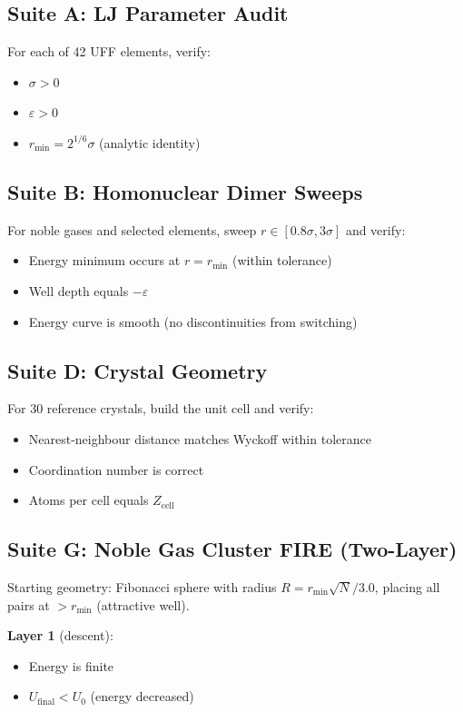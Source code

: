 \documentclass[11pt,twoside]{article}
\newcommand{\rmin}{r_{\mathrm{min}}}
\begin{document}
\subsection{Suite A: LJ Parameter Audit}

For each of 42 UFF elements, verify:
\begin{itemize}
  \item $\sigma > 0$
  \item $\varepsilon > 0$
  \item $\rmin = 2^{1/6} \sigma$ (analytic identity)
\end{itemize}

\subsection{Suite B: Homonuclear Dimer Sweeps}

For noble gases and selected elements, sweep $r \in [0.8\sigma, 3\sigma]$
and verify:
\begin{itemize}
  \item Energy minimum occurs at $r = \rmin$ (within tolerance)
  \item Well depth equals $-\varepsilon$
  \item Energy curve is smooth (no discontinuities from switching)
\end{itemize}

\subsection{Suite D: Crystal Geometry}

For 30 reference crystals, build the unit cell and verify:
\begin{itemize}
  \item Nearest-neighbour distance matches Wyckoff within tolerance
  \item Coordination number is correct
  \item Atoms per cell equals $Z_{\mathrm{cell}}$
\end{itemize}

\subsection{Suite G: Noble Gas Cluster FIRE (Two-Layer)}

Starting geometry: Fibonacci sphere with radius
$R = \rmin \sqrt{N}/3.0$, placing all pairs at $> \rmin$ (attractive well).

\textbf{Layer 1} (descent):
\begin{itemize}
  \item Energy is finite
  \item $U_{\mathrm{final}} < U_0$ (energy decreased)
\end{itemize}
\end{document}
